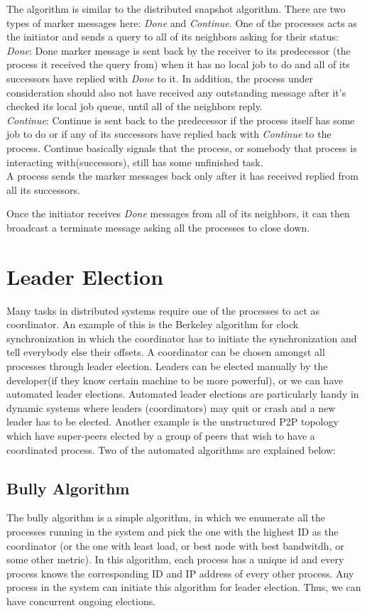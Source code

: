 \documentclass[twoside]{article}
\begin{document}
The algorithm is similar to the distributed snapshot algorithm. There are two types of marker messages here: \emph{Done} and \emph{Continue}. One of the processes acts as the initiator and sends a query to all of its neighbors asking for their status:\\
\emph{Done}: Done marker message is sent back by the receiver to its predecessor (the process it received the query from) when it has no local job to do and all of its successors have replied with \emph{Done} to it. In addition, the process under consideration should also not have received any outstanding message after it's checked its local job queue, until all of the neighbors reply.\\
\emph{Continue}: Continue is sent back to the predecessor if the process itself has some job to do or if any of its successors have replied back with \emph{Continue} to the process. Continue basically signals that the process, or somebody that process is interacting with(successors), still has some unfinished task.\\
A process sends the marker messages back only after it has received replied from all its successors.

Once the initiator receives \emph{Done} messages from all of its neighbors, it can then broadcast a terminate message asking all the processes to close down.

\section{Leader Election}
Many tasks in distributed systems require one of the processes to act as coordinator. An example of this is the Berkeley algorithm for clock synchronization in which the coordinator has to initiate the synchronization and tell everybody else their offsets. A coordinator can be chosen amongst all processes through leader election. Leaders can be elected manually by the developer(if they know certain machine to be more powerful), or we can have automated leader elections. Automated leader elections are particularly handy in dynamic systems where leaders (coordinators) may quit or crash and a new leader has to be elected. Another example is the unstructured P2P topology which have super-peers elected by a group of peers that wish to have a coordinated process. Two of the automated algorithms are explained below:
\subsection{Bully Algorithm}
The bully algorithm is a simple algorithm, in which we enumerate all the processes running in the system and pick the one with the highest ID as the coordinator (or the one with least load, or best node with best bandwitdh, or some other metric). In this algorithm, each process has a unique id and every process knows the corresponding ID and IP address of every other process. Any process in the system can initiate this algorithm for leader election. Thus, we can have concurrent ongoing elections.
\end{document}
